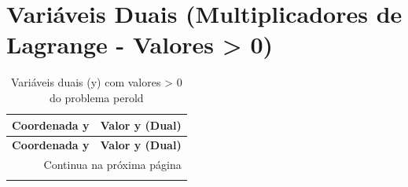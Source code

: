 \documentclass[12pt]{article}
\begin{document}
\section{Variáveis Duais (Multiplicadores de Lagrange - Valores > 0)}

\begin{longtable}{@{}cc@{}}
\caption{Variáveis duais (y) com valores > 0 do problema perold} \\
\toprule
\textbf{Coordenada y} & \textbf{Valor y (Dual)} \\
\midrule
\endfirsthead

\toprule
\textbf{Coordenada y} & \textbf{Valor y (Dual)} \\
\midrule
\endhead

\midrule \multicolumn{2}{r}{{Continua na próxima página}} \\ \midrule
\endfoot


\end{longtable}
\end{document}
